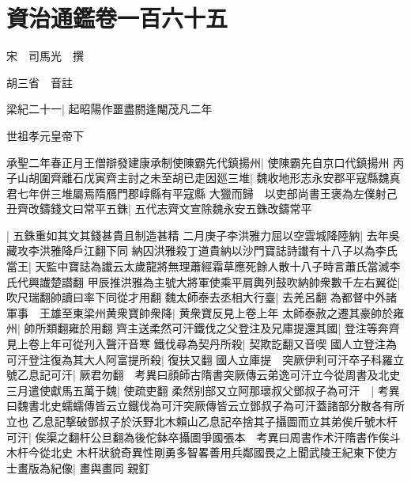 \section{資治通鑑卷一百六十五}
宋　司馬光　撰

胡三省　音註

梁紀二十一|{
	起昭陽作噩盡閼逢閹茂凡二年}


世祖孝元皇帝下

承聖二年春正月王僧辯發建康承制使陳霸先代鎮揚州|{
	使陳霸先自京口代鎮揚州}
丙子山胡圍齊離石戊寅齊主討之未至胡已走因廵三堆|{
	魏收地形志永安郡平寇縣魏真君七年併三堆屬焉隋鴈門郡崞縣有平寇縣}
大獵而歸　以吏部尚書王褒為左僕射己丑齊改鑄錢文曰常平五銖|{
	五代志齊文宣除魏永安五銖改鑄常平}


|{
	五銖重如其文其錢甚貴且制造甚精}
二月庚子李洪雅力屈以空雲城降陸納|{
	去年吳藏攻李洪雅降戶江翻下同}
納囚洪雅殺丁道貴納以沙門寶誌詩䜟有十八子以為李氏當王|{
	天監中寶誌為䜟云太歲龍將無理蕭經霜草應死餘人散十八子時言蕭氏當滅李氏代興䜟楚譛翻}
甲辰推洪雅為主號大將軍使乘平肩輿列鼓吹納帥衆數千左右翼從|{
	吹尺瑞翻帥讀曰率下同從才用翻}
魏太師泰去丞相大行臺|{
	去羌呂翻}
為都督中外諸軍事　王雄至東梁州黄衆寶帥衆降|{
	黄衆寶反見上卷上年}
太師泰赦之遷其豪帥於雍州|{
	帥所類翻雍於用翻}
齊主送柔然可汗鐵伐之父登注及兄庫提還其國|{
	登注等奔齊見上卷上年可從刋入聲汗音寒}
鐵伐尋為契丹所殺|{
	契欺訖翻又音喫}
國人立登注為可汗登注復為其大人阿富提所殺|{
	復扶又翻}
國人立庫提　突厥伊利可汗卒子科羅立號乙息記可汗|{
	厥君勿翻　考異曰顔師古隋書突厥傳云弟逸可汗立今從周書及北史}
三月遣使獻馬五萬于魏|{
	使疏吏翻}
柔然别部又立阿那瓌叔父鄧叔子為可汗　|{
	考異曰魏書北史蠕蠕傳皆云立鐵伐為可汗突厥傳皆云立鄧叔子為可汗蓋諸部分散各有所立也}
乙息記撃破鄧叔子於沃野北木賴山乙息記卒捨其子攝圖而立其弟俟斤號木杆可汗|{
	俟渠之翻杆公旦翻為後佗鉢卒攝圖爭國張本　考異曰周書作术汗隋書作俟斗木杆今從北史}
木杆狀貌奇異性剛勇多智畧善用兵鄰國畏之上聞武陵王紀東下使方士畫版為紀像|{
	畫與畫同}
親釘

